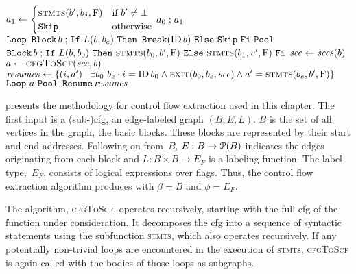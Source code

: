 \begin{algorithm}
\begin{algorithmic}
      \State $a_1\gets\begin{cases}
        \Call{stmts}{b',b_j,\false} & \text{if }b'\neq\bot \\
        \ASkip & \text{otherwise}
      \end{cases}$
      \State\Return $a_0\mathrel{\mathtt{;}} a_1$
    \EndFunction
      \State\Return $\mathtt{Loop}~\operatorname{\mathtt{Block}} b\mathrel{\mathtt{;}}
      \mathtt{If}~L(b,b_e)~\mathtt{Then}~\operatorname{\mathtt{Break}}(\operatorname{ID} b)~\mathtt{Else}~\mathtt{Skip}~\mathtt{Fi}~\mathtt{Pool}$
    \EndFunction
        \State\Return $\ABB b\ASeq\AIf~L(b,b_0)~\AThen~
        \Call{stmts}{b_0,b',\false}~\AElse~\Call{stmts}{b_1,v',\false}~\AFi$
    \EndFunction
    \label{line:loop}
      \State $\mathit{scc}\gets\mathit{sccs}(b)$
      \State $a\gets\Call{cfgToScf}{\var{scc},b}$
      \State $\var{resumes}\gets\{(i,a')\mid
      \exists b_0~b_e\cdot i=\ID b_0\wedge
      \Call{exit}{b_0,b_e,\var{scc}}\wedge a'=\Call{stmts}{b_e,b',\false}\}$
      \State\Return $\mathtt{Loop}~a~\mathtt{Pool}~\operatorname{\mathtt{Resume}}\mathit{resumes}$
    \EndFunction
  \end{algorithmic}
\end{algorithm}

 presents the methodology for control flow extraction
used in this chapter.
The first input is a (sub-)\ac{cfg}, an edge-labeled graph $(B,E,L)$.
$B$ is the set of all vertices in the graph, the basic blocks.%
%
These blocks are represented by their start and end addresses.
Following on from~$B$, $E:B\rightarrow\operatorname{\mathcal{P}}(B)$%
indicates the edges originating from each block
and $L:B\times B\rightarrow E_F$ is a labeling function.
The label type,~$E_F$, consists of logical expressions over flags.%
Thus, the control flow extraction algorithm
produces  with $\beta=B$ and $\phi=E_F$.

The algorithm, \textsc{cfgToScf}, operates recursively,
starting with the full \ac{cfg} of the function under consideration.
It decomposes the \ac{cfg} into a sequence of syntactic statements
using the subfunction \textsc{stmts}, which also operates recursively.
If any potentially non-trivial loops are encountered
in the execution of \textsc{stmts},
\textsc{cfgToScf} is again called with the bodies of those loops as subgraphs.

